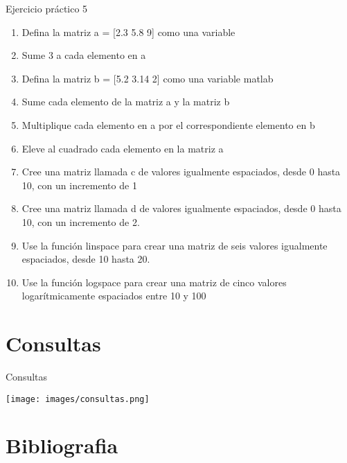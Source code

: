 \documentclass{bredelebeamer}
\begin{document}
\begin{frame}{Ejercicio práctico 5}
\begin{enumerate}
\item Defina la matriz a = [2.3 5.8 9] como una variable
\item Sume 3 a cada elemento en a
\item Defina la matriz b = [5.2 3.14 2] como una variable matlab
\item Sume cada elemento de la matriz a y la matriz b
\item Multiplique cada elemento en a por el correspondiente elemento en b
\item Eleve al cuadrado cada elemento en la matriz a
\item Cree una matriz llamada c de valores igualmente espaciados, desde 0 hasta 10, con un incremento de 1
\item Cree una matriz llamada d de valores igualmente espaciados, desde 0 hasta 10, con un incremento de 2.
\item Use la función linspace para crear una matriz de seis valores igualmente espaciados, desde 10 hasta 20.
\item Use la función logspace para crear una matriz de cinco valores logarítmicamente espaciados entre 10 y 100
\end{enumerate}
\end{frame}




\section{Consultas}
\begin{frame}{Consultas}
\begin{center}
\texttt{[image: images/consultas.png]}
\end{center}
\end{frame}





\section{Bibliografia}
\end{document}
